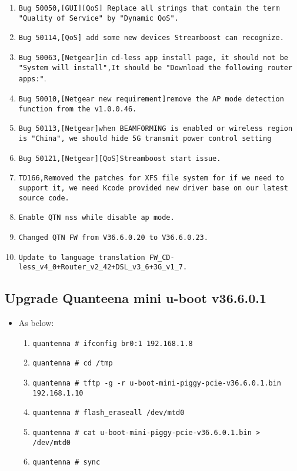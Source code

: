 \documentclass[12pt]{report}
\begin{document}
\begin{itemize}
\begin{enumerate}
		\item \texttt{Bug 50050,[GUI][QoS] Replace all strings that contain the term "Quality of Service" by "Dynamic QoS".}
		\item \texttt{Bug 50114,[QoS] add some new devices Streamboost can recognize.}
		\item \texttt{Bug 50063,[Netgear]in cd-less app install page, it should not be "System will install",It should be "Download the following router apps:"}.
		\item \texttt{Bug 50010,[Netgear new requirement]remove the AP mode detection function from the v1.0.0.46.}
		\item \texttt{Bug 50113,[Netgear]when BEAMFORMING is enabled or wireless region is "China", we should hide 5G transmit power control setting}
		\item \texttt{Bug 50121,[Netgear][QoS]Streamboost start issue.}
		\item \texttt{TD166,Removed the patches for XFS file system for if we need to support it, we need Kcode provided new driver base on our latest source code.}
		\item \texttt{Enable QTN nss while disable ap mode.}
		\item \texttt{Changed QTN FW from V36.6.0.20 to V36.6.0.23.}
		\item \texttt{Update to language translation FW\_CD-less\_v4\_0+Router\_v2\_42+DSL\_v3\_6+3G\_v1\_7.}

    	\end{enumerate}
    \end{itemize}

    \subsection{Upgrade Quanteena mini u-boot v36.6.0.1}
    \begin{itemize}
    \item As below:
    	\begin{enumerate}
		\item \texttt{quantenna \# ifconfig br0:1 192.168.1.8}
		\item \texttt{quantenna \# cd /tmp}
		\item \texttt{quantenna \# tftp -g -r u-boot-mini-piggy-pcie-v36.6.0.1.bin 192.168.1.10}
		\item \texttt{quantenna \# flash\_eraseall /dev/mtd0}
		\item \texttt{quantenna \# cat u-boot-mini-piggy-pcie-v36.6.0.1.bin > /dev/mtd0}
		\item \texttt{quantenna \# sync}
    	\end{enumerate}
    \end{itemize}
\end{document}
